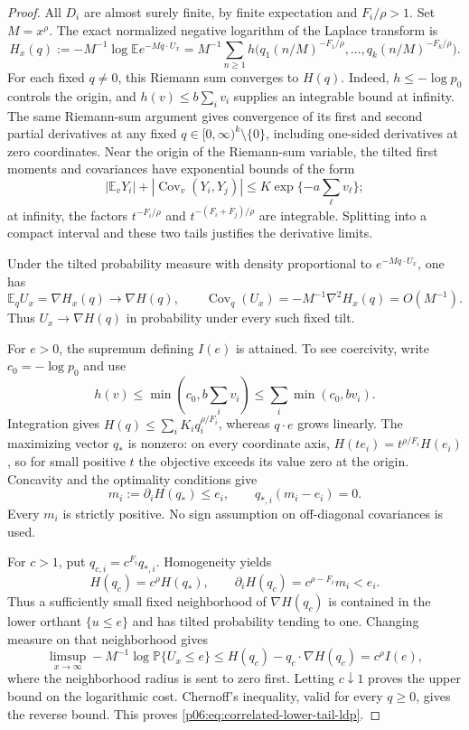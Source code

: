 \documentclass[11pt,letterpaper]{article}
\theoremstyle{definition}
\theoremstyle{remark}
\newcommand{\1}{\mathbf 1}
\begin{document}
\begin{proof}
All $D_i$ are almost surely finite, by finite expectation and
$F_i/\rho>1$. Set $M=x^\rho$. The exact normalized negative logarithm of
the Laplace transform is
\[
 H_x(q):=-M^{-1}\log\mathbb E e^{-M q\cdot U_x}
 =M^{-1}\sum_{n\ge1}
 h\big(q_1(n/M)^{-F_1/\rho},\ldots,
       q_k(n/M)^{-F_k/\rho}\big).
\]
For each fixed $q\ne0$, this Riemann sum converges to $H(q)$.
Indeed, $h\le-\log p_0$ controls the origin, and
$h(v)\le b\sum_i v_i$ supplies an integrable bound at infinity.
The same Riemann-sum argument gives convergence of its first and second
partial derivatives at any fixed $q\in[0,\infty)^k\setminus\{0\}$,
including one-sided derivatives at zero coordinates.
Near the origin of the Riemann-sum variable, the tilted first moments
and covariances have exponential bounds of the form
\[
 |\mathbb E_vY_i|+|\operatorname{Cov}_v(Y_i,Y_j)|
 \le K\exp\{-a\textstyle\sum_\ell v_\ell\};
\]
at infinity, the factors $t^{-F_i/\rho}$ and
$t^{-(F_i+F_j)/\rho}$ are integrable. Splitting into a compact interval
and these two tails justifies the derivative limits.

Under the tilted probability measure with density proportional to
$e^{-M q\cdot U_x}$, one has
\[
 \mathbb E_q U_x=\nabla H_x(q)\longrightarrow\nabla H(q),\qquad
 \operatorname{Cov}_q(U_x)=-M^{-1}\nabla^2H_x(q)=O(M^{-1}).
\]
Thus $U_x\to\nabla H(q)$ in probability under every such fixed tilt.

For $e>0$, the supremum defining $I(e)$ is attained. To see coercivity,
write $c_0=-\log p_0$ and use
\[
 h(v)\le\min(c_0,b\textstyle\sum_i v_i)
 \le\sum_i\min(c_0,bv_i).
\]
Integration gives $H(q)\le\sum_i K_i q_i^{\rho/F_i}$, whereas
$q\cdot e$ grows linearly. The maximizing vector $q_*$ is nonzero:
on every coordinate axis, $H(te_i)=t^{\rho/F_i}H(e_i)$, so for small
positive $t$ the objective exceeds its value zero at the origin.
Concavity and the optimality conditions give
\[
 m_i:=\partial_iH(q_*)\le e_i,
 \qquad q_{*,i}(m_i-e_i)=0.
\]
Every $m_i$ is strictly positive. No sign assumption on off-diagonal
covariances is used.

For $c>1$, put $q_{c,i}=c^{F_i}q_{*,i}$. Homogeneity yields
\[
 H(q_c)=c^\rho H(q_*),\qquad
 \partial_iH(q_c)=c^{\rho-F_i}m_i<e_i.
\]
Thus a sufficiently small fixed neighborhood of $\nabla H(q_c)$ is
contained in the lower orthant $\{u\le e\}$ and has tilted probability
tending to one. Changing measure on that neighborhood gives
\[
 \limsup_{x\to\infty}-M^{-1}\log\mathbb P\{U_x\le e\}
 \le H(q_c)-q_c\cdot\nabla H(q_c)
 =c^\rho I(e),
\]
where the neighborhood radius is sent to zero first. Letting $c\downarrow1$
proves the upper bound on the logarithmic cost. Chernoff's inequality,
valid for every $q\ge0$, gives the reverse bound. This proves
\eqref{p06:eq:correlated-lower-tail-ldp}.
\end{proof}
\end{document}

